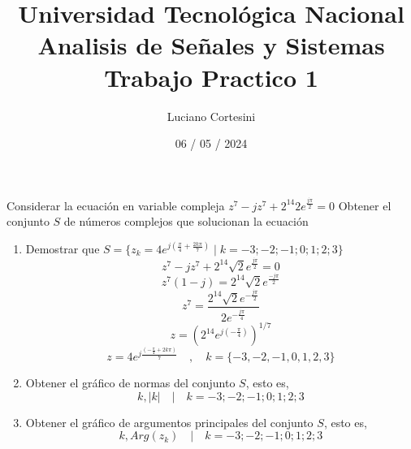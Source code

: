 \documentclass[12pt]{report}
\title{%
  \fontsize{25}{0}\selectfont Universidad Tecnológica Nacional \\
  \fontsize{22}{30}\selectfont Analisis de Señales y Sistemas \\
  \fontsize{20}{25}\selectfont Trabajo Practico 1
}
\author{Luciano Cortesini}
\date{06 / 05 / 2024}
\begin{document}
\maketitle

\chapter{}
Considerar la ecuación en variable compleja $z^7-jz^7+2^{14}2e^{\frac{j\pi}{2}}=0$
Obtener el conjunto $S$ de números complejos que solucionan la ecuación

\begin{enumerate}
  \item Demostrar que  $S = \{z_k = 4e^{j(\frac{\pi}{4}+\frac{2k\pi}{7})} \mid k=-3;-2;-1;0;1;2;3\}$
    $$z^7 - jz^7 + 2^{14}\sqrt{2}e^{\frac{j\pi}{2}} = 0$$
    $$z^7(1-j) = 2^{14}\sqrt{2}e^{\frac{-j\pi}{2}}$$
    $$z^7 = \frac{2^{14}\sqrt{2}e^{-\frac{j\pi}{2}}} {2e^{-\frac{j\pi}{4}}}$$
    $$z = (2^{14}e^{j(-\frac{\pi} {4})})^{1/7}$$
    $$z = 4e^{j\frac{(-\frac{\pi}{4}+2k\pi)}{7}} \quad,\quad k = \{-3,-2,-1,0,1,2,3\}$$

  \item Obtener el gráfico de normas del conjunto $S$, esto es,
    $$k, |k| \quad | \quad k = -3;-2;-1;0;1;2;3 $$

  \item Obtener el gráfico de argumentos principales del conjunto $S$, esto es,
    $$k, Arg(z_k) \quad | \quad k = -3;-2;-1;0;1;2;3 $$

\end{enumerate}

\chapter{}
\end{document}
